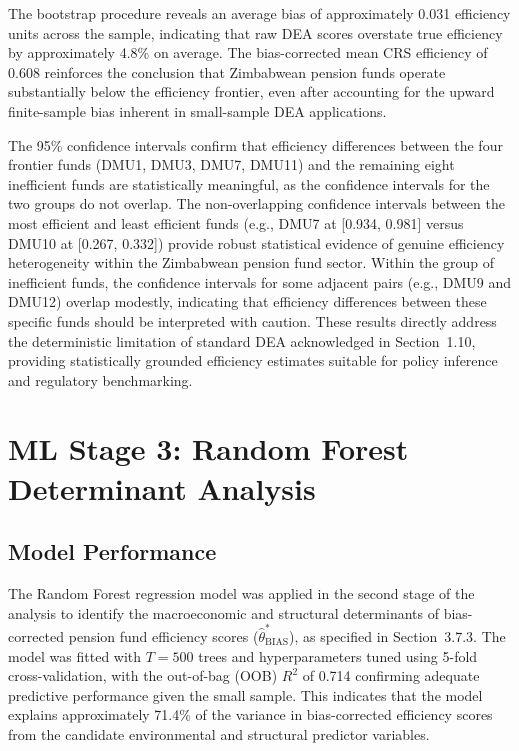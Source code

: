 \documentclass[12pt,a4paper]{article}
\begin{document}
The bootstrap procedure reveals an average bias of approximately 0.031 efficiency units across the sample, indicating that raw DEA scores overstate true efficiency by approximately 4.8\% on average. The bias-corrected mean CRS efficiency of 0.608 reinforces the conclusion that Zimbabwean pension funds operate substantially below the efficiency frontier, even after accounting for the upward finite-sample bias inherent in small-sample DEA applications.

The 95\% confidence intervals confirm that efficiency differences between the four frontier funds (DMU1, DMU3, DMU7, DMU11) and the remaining eight inefficient funds are statistically meaningful, as the confidence intervals for the two groups do not overlap. The non-overlapping confidence intervals between the most efficient and least efficient funds (e.g., DMU7 at [0.934, 0.981] versus DMU10 at [0.267, 0.332]) provide robust statistical evidence of genuine efficiency heterogeneity within the Zimbabwean pension fund sector. Within the group of inefficient funds, the confidence intervals for some adjacent pairs (e.g., DMU9 and DMU12) overlap modestly, indicating that efficiency differences between these specific funds should be interpreted with caution. These results directly address the deterministic limitation of standard DEA acknowledged in Section~1.10, providing statistically grounded efficiency estimates suitable for policy inference and regulatory benchmarking.

\section{ML Stage 3: Random Forest Determinant Analysis}

\subsection{Model Performance}

The Random Forest regression model was applied in the second stage of the analysis to identify the macroeconomic and structural determinants of bias-corrected pension fund efficiency scores ($\hat{\theta}^*_{\text{BIAS}}$), as specified in Section~3.7.3. The model was fitted with $T = 500$ trees and hyperparameters tuned using 5-fold cross-validation, with the out-of-bag (OOB) $R^2$ of 0.714 confirming adequate predictive performance given the small sample. This indicates that the model explains approximately 71.4\% of the variance in bias-corrected efficiency scores from the candidate environmental and structural predictor variables.
\end{document}
